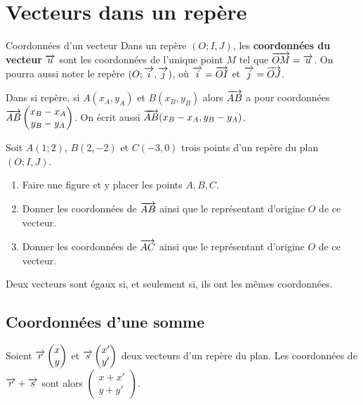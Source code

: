 \documentclass[11pt]{article}
\begin{document}
\section{Vecteurs dans un repère}
\begin{defi}{Coordonnées d'un vecteur}
  Dans un repère $(O; I, J)$, les \textbf{coordonnées du vecteur} $\overrightarrow{u}$ sont
  les coordonnées de l'unique point $M$ tel que $\overrightarrow{OM}=\overrightarrow{u}$.
  On pourra aussi noter le repère $(O; \overrightarrow{i}, \overrightarrow{j})$, où $\overrightarrow{i}=\overrightarrow{OI}$ et
  $\overrightarrow{j}=\overrightarrow{OJ}$.
\end{defi}
\begin{prop}
  Dans si repère, si $A(x_A, y_A)$ et $B(x_B, y_B)$ alors $\overrightarrow{AB}$ a pour
  coordonnées $\overrightarrow{AB}\begin{pmatrix}x_B-x_A\\y_B-y_A\end{pmatrix}$. On écrit
  aussi $\overrightarrow{AB}(x_B-x_A,y_B-y_A)$.
\end{prop}
\begin{app}
  Soit $A(1;2)$, $B(2, -2)$ et $C(-3, 0)$ trois points d'un repère du plan $(O;
  I, J)$.
  \begin{enumerate}
    \item Faire une figure et y placer les points $A, B, C$.
    \item Donner les coordonnées de $\overrightarrow{AB}$ ainsi que le représentant
      d'origine $O$ de ce vecteur.
    \item Donner les coordonnées de $\overrightarrow{AC}$ ainsi que le représentant
      d'origine $O$ de ce vecteur.
  \end{enumerate}
\end{app}

\begin{prop}
  Deux vecteurs sont égaux si, et seulement si, ils ont les mêmes coordonnées.
\end{prop}

\subsection{Coordonnées d'une somme}
\begin{prop}
  Soient $\overrightarrow{r}\begin{pmatrix}x\\y\end{pmatrix}$ et
  $\overrightarrow{s}\begin{pmatrix}x'\\y'\end{pmatrix}$ deux vecteurs d'un repère du plan.
  Les coordonnées de $\overrightarrow{r}+\overrightarrow{s}$ sont alors
  $\begin{pmatrix}x+x'\\y+y'\end{pmatrix}$.
\end{prop}
\end{document}
